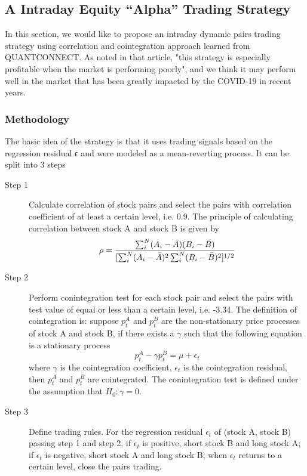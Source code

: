 \documentclass{article}
\begin{document}
\subsection{A Intraday Equity “Alpha” Trading Strategy}

In this section, we would like to propose an intraday dynamic pairs trading strategy using correlation and cointegration approach learned from QUANTCONNECT\cite{qc}. As noted in that article, "this strategy is especially profitable when the market is performing poorly", and we think it may perform well in the market that has been greatly impacted by the COVID-19 in recent years.

\subsubsection{Methodology}

The basic idea of the strategy is that it uses trading signals based on the regression residual ϵ and were modeled as a mean-reverting process. It can be split into 3 steps
\begin{description}
    \item[Step 1] Calculate correlation of stock pairs and select the pairs with correlation coefficient of at least a certain level, i.e. 0.9. The principle of calculating correlation between stock A and stock B is given by 
    \[ \rho = \frac{\sum_i^N (A_i - \Bar{A})(B_i - \Bar{B})}{[\sum_i^N (A_i - \Bar{A})^2 \sum_i^N (B_i - \Bar{B})^2]^{1/2}}\]
    \item[Step 2] Perform conintegration test for each stock pair and select the pairs with test value of equal or less than a certain level, i.e. -3.34. The definition of cointegration is: suppose $p_t^A$ and $p_t^B$ are the non-stationary price processes of stock A and stock B, if there exists a $\gamma$ such that the following equation is a stationary process
    \[ p_t^A - \gamma p_t^B = \mu + \epsilon_t \]
    where $\gamma$ is the cointegration coefficient, $\epsilon_t$ is the cointegration residual, then $p_t^A$ and $p_t^B$ are cointegrated. The conintegration test is defined under the assumption that $H_0:\gamma=0$. 
    \item[Step 3] Define trading rules. For the regression residual $\epsilon_t$ of (stock A, stock B) passing step 1 and step 2, if $\epsilon_t$ is positive, short stock B and long stock A; if $\epsilon_t$ is negative, short stock A and long stock B; when $\epsilon_t$ returns to a certain level, close the pairs trading. 
\end{description}
\end{document}
